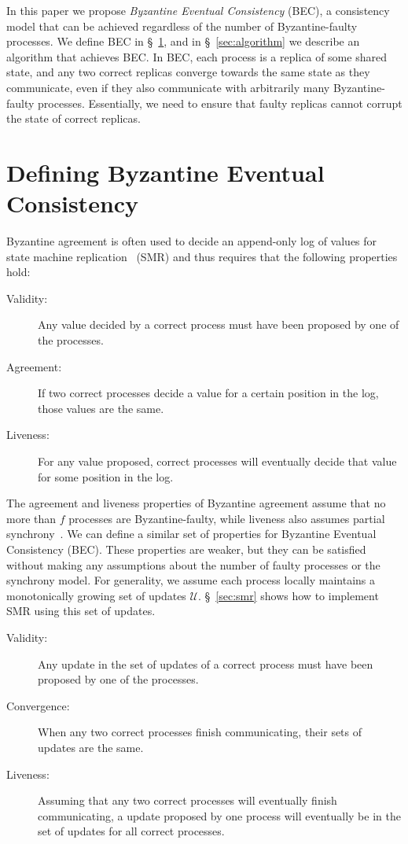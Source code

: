 \documentclass[manuscript,anonymous]{acmart}
\begin{document}
In this paper we propose \emph{Byzantine Eventual Consistency} (BEC), a consistency model that can be achieved regardless of the number of Byzantine-faulty processes.
We define BEC in \S~\ref{sec:properties}, and in \S~\ref{sec:algorithm} we describe an algorithm that achieves BEC.
In BEC, each process is a replica of some shared state, and any two correct replicas converge towards the same state as they communicate, even if they also communicate with arbitrarily many Byzantine-faulty processes.
Essentially, we need to ensure that faulty replicas cannot corrupt the state of correct replicas.

\section{Defining Byzantine Eventual Consistency}\label{sec:properties}

Byzantine agreement is often used to decide an append-only log of values for state machine replication~\cite{Schneider:1990} (SMR) and thus requires that the following properties hold:

\begin{description}
\item[Validity:] Any value decided by a correct process must have been proposed by one of the processes.
\item[Agreement:] If two correct processes decide a value for a certain position in the log, those values are the same.
\item[Liveness:] For any value proposed, correct processes will eventually decide that value for some position in the log.
\end{description}

The agreement and liveness properties of Byzantine agreement assume that no more than $f$ processes are Byzantine-faulty, while liveness also assumes partial synchrony~\cite{Dwork:1988}.
We can define a similar set of properties for Byzantine Eventual Consistency (BEC).
These properties are weaker, but they can be satisfied without making any assumptions about the number of faulty processes or the synchrony model.
For generality, we assume each process locally maintains a monotonically growing set of updates $\mathcal{U}$.
\S~\ref{sec:smr} shows how to implement SMR using this set of updates.

\begin{description}
\item[Validity:] Any update in the set of updates of a correct process must have been proposed by one of the processes.
\item[Convergence:] When any two correct processes finish communicating, their sets of updates are the same.
\item[Liveness:] Assuming that any two correct processes will eventually finish communicating, a update proposed by one process will eventually be in the set of updates for all correct processes.
\end{description}
\end{document}
